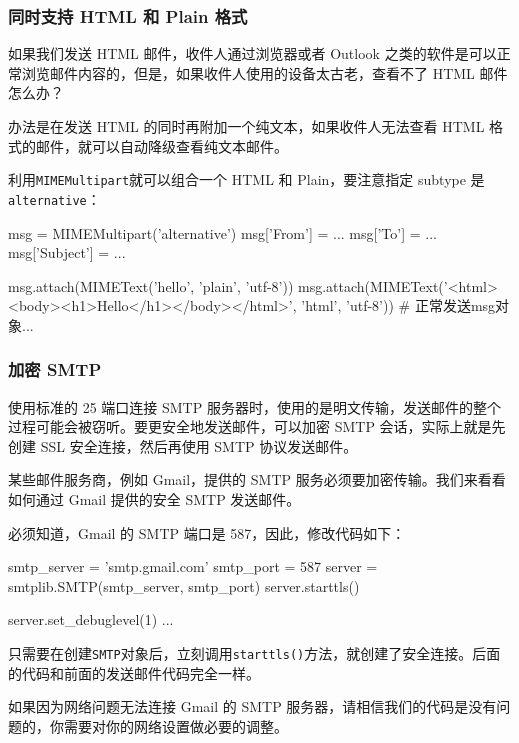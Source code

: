 \hypertarget{ux540cux65f6ux652fux6301-html-ux548c-plain-ux683cux5f0f}{%
\subsubsection{同时支持 HTML 和 Plain
格式}\label{ux540cux65f6ux652fux6301-html-ux548c-plain-ux683cux5f0f}}

如果我们发送 HTML 邮件，收件人通过浏览器或者 Outlook
之类的软件是可以正常浏览邮件内容的，但是，如果收件人使用的设备太古老，查看不了
HTML 邮件怎么办？

办法是在发送 HTML 的同时再附加一个纯文本，如果收件人无法查看 HTML
格式的邮件，就可以自动降级查看纯文本邮件。

利用\texttt{MIMEMultipart}就可以组合一个 HTML 和 Plain，要注意指定
subtype 是\texttt{alternative}：

\begin{pythoncode}
msg = MIMEMultipart('alternative')
msg['From'] = ...
msg['To'] = ...
msg['Subject'] = ...

msg.attach(MIMEText('hello', 'plain', 'utf-8'))
msg.attach(MIMEText('<html><body><h1>Hello</h1></body></html>', 'html', 'utf-8'))
# 正常发送msg对象...
\end{pythoncode}

\hypertarget{ux52a0ux5bc6-smtp}{%
\subsubsection{加密 SMTP}\label{ux52a0ux5bc6-smtp}}

使用标准的 25 端口连接 SMTP
服务器时，使用的是明文传输，发送邮件的整个过程可能会被窃听。要更安全地发送邮件，可以加密
SMTP 会话，实际上就是先创建 SSL 安全连接，然后再使用 SMTP 协议发送邮件。

某些邮件服务商，例如 Gmail，提供的 SMTP
服务必须要加密传输。我们来看看如何通过 Gmail 提供的安全 SMTP 发送邮件。

必须知道，Gmail 的 SMTP 端口是 587，因此，修改代码如下：

\begin{pythoncode}
smtp_server = 'smtp.gmail.com'
smtp_port = 587
server = smtplib.SMTP(smtp_server, smtp_port)
server.starttls()

server.set_debuglevel(1)
...
\end{pythoncode}

只需要在创建\texttt{SMTP}对象后，立刻调用\texttt{starttls()}方法，就创建了安全连接。后面的代码和前面的发送邮件代码完全一样。

如果因为网络问题无法连接 Gmail 的 SMTP
服务器，请相信我们的代码是没有问题的，你需要对你的网络设置做必要的调整。

